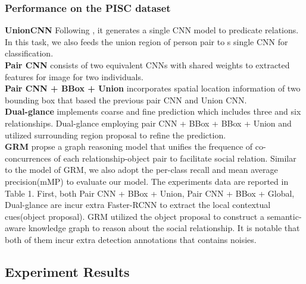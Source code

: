\documentclass{article}
\begin{document}
\subsubsection{Performance on the PISC dataset}
{\bf UnionCNN}  Following \cite{DBLP:conf/eccv/LuKBL16}, it generates a single CNN model to predicate relations. In this task, we also feeds the union region of person pair to s single CNN for classification.\\
{\bf Pair CNN}\cite{DBLP:conf/iccv/LiWZK17} consists of two equivalent CNNs with shared weights to extracted features for image for two individuals.\\
{\bf Pair CNN + BBox + Union}\cite{DBLP:conf/iccv/LiWZK17} incorporates spatial location information of two bounding box that based the previous pair CNN and Union CNN.\\
{\bf Dual-glance}\cite{DBLP:conf/iccv/LiWZK17} implements coarse and fine prediction which includes three and six relationships. Dual-glance employing pair CNN + BBox + BBox + Union and utilized surrounding region proposal to refine the prediction.\\
{\bf GRM}\cite{DBLP:conf/ijcai/WangCRYCL18} propse a graph reasoning model that unifies the frequence of co-concurrences of each relationship-object pair to facilitate social relation.
Similar to the model of GRM, we also adopt the per-class recall and mean average precision(mMP) to evaluate our model. The experiments data are reported in Table 1. First, both Pair CNN + BBox + Union, Pair CNN + BBox + Global, Dual-glance are incur extra Faster-RCNN\cite{DBLP:conf/nips/RenHGS15} to extract the local contextual cues(object proposal). GRM utilized the object proposal to construct a semantic-aware  knowledge graph to reason about the social relationship. It is notable that both of them incur extra detection annotations that contains noisies.

\subsection{Experiment Results}
\end{document}
